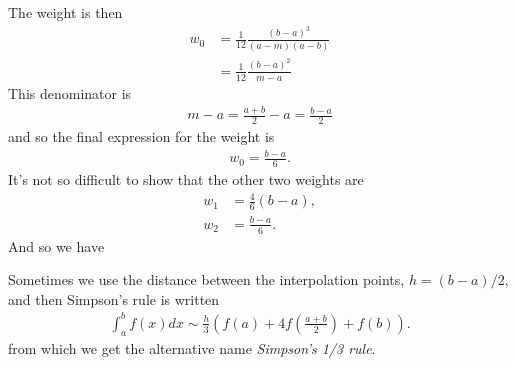 The weight is then
\begin{align*}
w_0 &= \frac{1}{12} \frac{\left(b - a\right)^3}{(a-m)(a-b)} \\
 &= \frac{1}{12} \frac{\left(b - a\right)^2}{m-a}
\end{align*}
This denominator is
\begin{align*}
m-a = \frac{a+b}{2}-a = \frac{b-a}{2}
\end{align*}
and so the final expression for the weight is
\begin{align*}
w_0 = \frac{b-a}{6}.
\end{align*}
It's not so difficult to show that the other two weights are
\begin{align*}
w_1 &= \frac{4}{6}\left(b-a\right), \\
w_2 &= \frac{b-a}{6}.
\end{align*}
And so we have 

\noindent {}

Sometimes we use the distance between the interpolation points, $h=(b-a)/2$, and then Simpson's rule is written
\begin{align*}
\int_a^b f(x)dx \sim \frac{h}{3}\left(f(a) + 4f\left(\frac{a+b}{2}\right)+ f(b) \right).
\end{align*}
from which we get the alternative name \textit{Simpson's 1/3 rule}.


